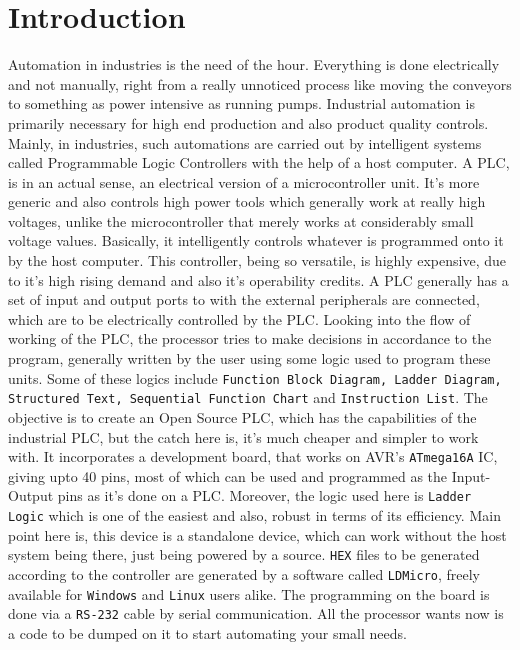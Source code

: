\documentclass[12pt]{article}
\begin{document}
\newpage
{\Large \section{Introduction}}

Automation in industries is the need of the hour. Everything is done electrically and not manually, right from a really unnoticed process like moving the conveyors to something as power intensive as running pumps. Industrial automation is primarily necessary for high end production and also product quality controls. Mainly, in industries, such automations are carried out by intelligent systems called Programmable Logic Controllers with the help of a host computer. A PLC, is in an actual sense, an electrical version of a microcontroller unit. It's more generic and also controls high power tools which generally work at really high voltages, unlike the microcontroller that merely works at considerably small voltage values. Basically, it intelligently controls whatever is programmed onto it by the host computer. This controller, being so versatile, is highly expensive, due to it's high rising demand and also it's operability credits.  \singlespace
\vspace{12pt}
A PLC generally has a set of input and output ports to with the external peripherals are connected, which are to be electrically controlled by the PLC. Looking into the flow of working of the PLC, the processor tries to make decisions in accordance to the program, generally written by the user using some logic used to program these units. Some of these logics include \texttt{Function Block Diagram, Ladder Diagram, Structured Text, Sequential Function Chart} and \texttt{Instruction List}.\singlespace
\vspace{12pt}
The objective is to create an Open Source PLC, which has the capabilities of the industrial PLC, but the catch here is, it's much cheaper and simpler to work with. It incorporates a development board, that works on AVR's \texttt{ATmega16A} IC, giving upto 40 pins, most of which can be used and programmed as the Input-Output pins as it's done on a PLC. Moreover, the logic used here is \texttt{Ladder Logic} which is one of the easiest and also, robust in terms of its efficiency. Main point here is, this device is a standalone device, which can work without the host system being there, just being powered by a source. \texttt{HEX} files to be generated according to the controller are generated by a software called \texttt{LDMicro}, freely available for \texttt{Windows} and \texttt{Linux} users alike. The programming on the board is done via a \texttt{RS-232} cable by serial communication. All the processor wants now is a code to be dumped on it to start automating your small needs.\singlespace
\end{document}

